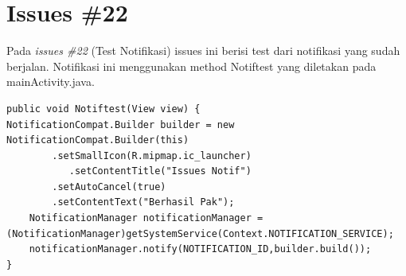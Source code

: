 \section{Issues \#22}
Pada \textit{issues \#22} (Test Notifikasi) issues ini berisi test dari notifikasi yang sudah berjalan. Notifikasi ini menggunakan method Notiftest yang diletakan pada mainActivity.java.
\begin{verbatim}
public void Notiftest(View view) {
NotificationCompat.Builder builder = new NotificationCompat.Builder(this)
        .setSmallIcon(R.mipmap.ic_launcher)
           .setContentTitle("Issues Notif")
        .setAutoCancel(true)
        .setContentText("Berhasil Pak");
    NotificationManager notificationManager = (NotificationManager)getSystemService(Context.NOTIFICATION_SERVICE);
    notificationManager.notify(NOTIFICATION_ID,builder.build());
}
\end{verbatim}

